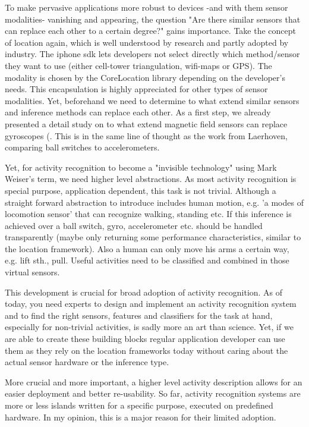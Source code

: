 To make pervasive applications more robust to devices -and with them
sensor modalities- vanishing and appearing, the question "Are there
similar sensors that can replace each other to a certain degree?"
gains importance. Take the concept of location again, which is well
understood by research and partly adopted by industry. The iphone sdk
lets developers not select directly which method/sensor they want to
use (either cell-tower triangulation, wifi-maps or GPS). The modality
is chosen by the CoreLocation library depending on the developer's
needs. This encapsulation is highly appreciated for other types of
sensor modalities. Yet, beforehand we need to determine to what extend
similar sensors and inference methods can replace each other. 
As a first step, we already presented a detail study on to what extend
magnetic field sensors can replace gyroscopes
(\cite{Kunze:2010he,Bahle:2010ww}. This is in the same line of thought
as the work from Laerhoven, comparing ball switches to accelerometers.

Yet, for activity recognition to become a "invisible technology" using
Mark Weiser's term, we need higher level abstractions. As most activity
recognition is special purpose, application dependent, this task is not
trivial. Although a straight forward abstraction to introduce
includes human motion, e.g. 'a modes of locomotion sensor' that can
recognize walking, standing etc. If this inference is achieved
over a ball switch, gyro, accelerometer etc. should be handled transparently
(maybe only returning some performance characteristics, similar to
the location framework). Also a human can only move his arms a certain
way, e.g. lift sth., pull. Useful activities need to be classified
and combined in those virtual sensors.

This development is crucial for broad adoption of activity recognition.
As of today, you need experts to design and implement an activity recognition
system and to find the right sensors, features and classifiers for
the task at hand, especially for non-trivial activities, 
is sadly more an art than science. Yet, if we are able to create these
building blocks regular application developer can use them as they 
rely on the location frameworks today without caring about the
actual sensor hardware or the inference type.

More crucial and more important, a higher level activity description
allows for an easier deployment and better re-usability. So far,
activity recognition systems are more or less islands written for
a specific purpose, executed on predefined hardware. In my opinion,
this is a major reason for their limited adoption.

